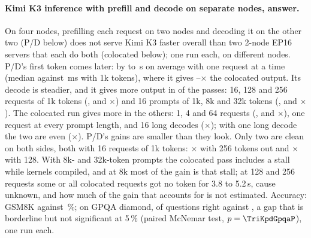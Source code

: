 \paragraph{Kimi K3 inference with prefill and decode on separate nodes, answer.} On four nodes, prefilling each request on two nodes and decoding it on the other two (P/D below) does not serve Kimi K3 faster overall than two 2-node EP16 servers that each do both (colocated below); one run each, on different nodes. P/D's first token comes later: by \TriKpdOneTtftGapLo{} to \TriKpdOneTtftGapHi\,s on average with one request at a time (median \TriKpdOneTtft{} against \TriKpdOneTtftCo\,ms with 1k tokens), where it gives \TriKpdOneRatioLo--\TriKpdOneRatioHi$\times$ the colocated output. Its decode is steadier, and it gives more output in \TriKpdLeadN{} of the \TriKpdPasses{} passes: 16, 128 and 256 requests of 1k tokens (\TriKpdSixteenRatio, \TriKpdOneTwentyEightRatio{} and \TriKpdTwoFiftySixRatio$\times$) and 16 prompts of 1k, 8k and 32k tokens (\TriKpdCtxOneSixteenRatio, \TriKpdCtxEightSixteenRatio{} and \TriKpdCtxThirtyTwoSixteenRatio$\times$). The colocated run gives more in the others: 1, 4 and 64 requests (\TriKpdOneRatio, \TriKpdFourRatio{} and \TriKpdSixtyFourRatio$\times$), one request at every prompt length, and 16 long decodes (\TriKpdDecodeSixteenRatio$\times$); with one long decode the two are even (\TriKpdDecodeOneRatio$\times$). P/D's gains are smaller than they look. Only two are clean on both sides, both with 16 requests of 1k tokens: \TriKpdSixteenRatio$\times$ with 256 tokens out and \TriKpdCtxOneSixteenRatio$\times$ with 128. With 8k- and 32k-token prompts the colocated pass includes a stall while kernels compiled, and at 8k most of the gain is that stall; at 128 and 256 requests some or all colocated requests got no token for 3.8 to 5.2\,s, cause unknown, and how much of the gain that accounts for is not estimated. Accuracy: GSM8K \TriKpdGsm{} against \TriKpdGsmCo\,\%; on GPQA diamond, \TriKpdGpqaRight{} of \TriKpdGpqaN{} questions right against \TriKpdGpqaRightCo, a gap that is borderline but not significant at 5\,\% (paired McNemar test, $p = \TriKpdGpqaP$), one run each.

